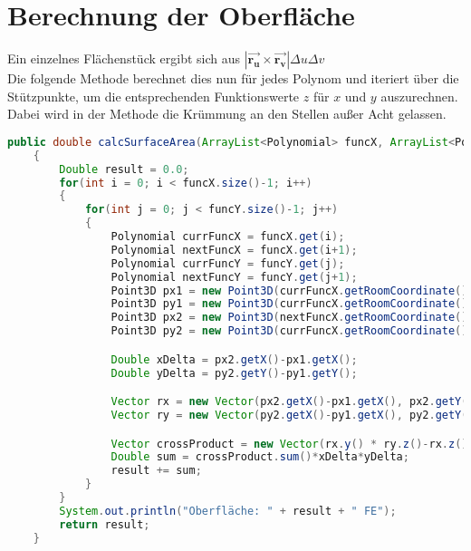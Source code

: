 \documentclass[11pt, bibliography=totocnumbered]{scrartcl}
\begin{document}
\section{Berechnung der Oberfl\"ache}
Ein einzelnes Fl\"achenst\"uck ergibt sich aus $|\overrightarrow{\boldsymbol{r_u}} \times \overrightarrow{\boldsymbol{r_v}}| \Delta u \Delta v$ \\
Die folgende Methode berechnet dies nun f\"ur jedes Polynom und iteriert \"uber die St\"utzpunkte, um die entsprechenden Funktionswerte $z$ f\"ur $x$ und $y$ auszurechnen. Dabei wird in der Methode die Kr\"ummung an den Stellen au{\ss}er Acht gelassen.
\begin{lstlisting}[caption={}, label={lst:label}, language=Java]
    public double calcSurfaceArea(ArrayList<Polynomial> funcX, ArrayList<Polynomial> funcY)
    {
        Double result = 0.0;
        for(int i = 0; i < funcX.size()-1; i++)
        {
            for(int j = 0; j < funcY.size()-1; j++)
            {
                Polynomial currFuncX = funcX.get(i);
                Polynomial nextFuncX = funcX.get(i+1);
                Polynomial currFuncY = funcY.get(j);
                Polynomial nextFuncY = funcY.get(j+1);
                Point3D px1 = new Point3D(currFuncX.getRoomCoordinate(), currFuncY.getRoomCoordinate(), currFuncX.derivation(currFuncY.getRoomCoordinate()));
                Point3D py1 = new Point3D(currFuncX.getRoomCoordinate(), currFuncY.getRoomCoordinate(), currFuncY.derivation(currFuncX.getRoomCoordinate()));
                Point3D px2 = new Point3D(nextFuncX.getRoomCoordinate(), currFuncY.getRoomCoordinate(), nextFuncX.derivation(currFuncY.getRoomCoordinate()));
                Point3D py2 = new Point3D(currFuncX.getRoomCoordinate(), nextFuncY.getRoomCoordinate(), nextFuncY.derivation(currFuncX.getRoomCoordinate()));

                Double xDelta = px2.getX()-px1.getX();
                Double yDelta = py2.getY()-py1.getY();

                Vector rx = new Vector(px2.getX()-px1.getX(), px2.getY()-px1.getY(), px2.getZ()-px1.getZ());
                Vector ry = new Vector(py2.getX()-py1.getX(), py2.getY()-py1.getY(), py2.getZ()-py1.getZ());

                Vector crossProduct = new Vector(rx.y() * ry.z()-rx.z()*ry.y(),rx.z()*ry.x()-rx.x()*ry.z(), rx.x()*ry.y()-rx.y()*ry.x());
                Double sum = crossProduct.sum()*xDelta*yDelta;
                result += sum;
            }
        }
        System.out.println("Oberfläche: " + result + " FE");
        return result;
    }
\end{lstlisting}
\end{document}

